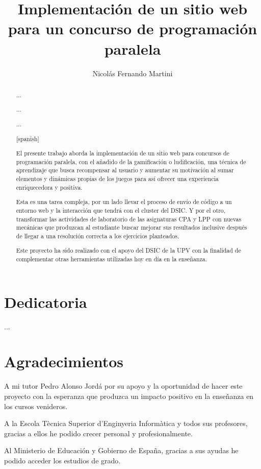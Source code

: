 \documentclass[11pt,spanish,listoffigures,listoftables]{tfgetsinf}
\title{Implementación de un sitio web para un concurso de programación paralela}
\author{Nicolás Fernando Martini}
\newenvironment{dedication}
{%
	\thispagestyle{empty}%
	\itshape             %
}
{\par %
	\vspace{\stretch{3}} %
	\clearpage           %
}
\begin{document}
	

\begin{dedication}	
	
	\chapter*{Dedicatoria}
	
	...

	\chapter*{Agradecimientos}
		A mi tutor Pedro Alonso Jordá por su apoyo y la oportunidad de hacer este proyecto con la esperanza que produzca un impacto positivo en la enseñanza en los cursos venideros. \par
		A la Escola Tècnica Superior d'Enginyeria Informàtica y todos sus profesores, gracias a ellos he podido crecer personal y profesionalmente. \par
		Al Ministerio de Educación y Gobierno de España, gracias a sus ayudas he podido acceder los estudios de grado.
		
\end{dedication}

\begin{abstract}

... \par

... \par

... \par

\end{abstract}

\begin{abstract}[spanish]
	
El presente trabajo aborda la implementación de un sitio web para concursos de programación paralela, con el añadido de la gamificación o ludificación, una técnica de aprendizaje que busca recompensar al usuario y aumentar su motivación al sumar elementos y dinámicas propias de los juegos para así ofrecer una experiencia enriquecedora y positiva. \par 

Esta es una tarea compleja, por un lado llevar el proceso de envío de código a un entorno web y la interacción que tendrá con el cluster \kahan del DSIC. Y por el otro, transformar las actividades de laboratorio de las asignaturas CPA y LPP con nuevas mecánicas que produzcan al estudiante buscar mejorar sus resultados inclusive después de llegar a una resolución correcta a los ejercicios planteados. \par

Este proyecto ha sido realizado con el apoyo del DSIC de la UPV con la finalidad de complementar otras herramientas utilizadas hoy en día en la enseñanza. \par


\end{abstract}
\end{document}
